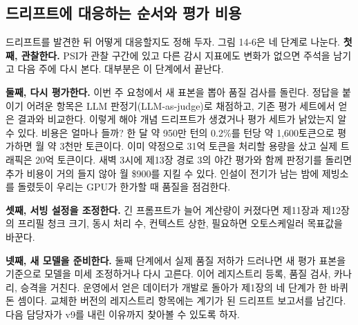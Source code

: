 \subsection*{드리프트에 대응하는 순서와 평가 비용}

드리프트를 발견한 뒤 어떻게 대응할지도 정해 두자. 그림 14-6은 네 단계로 나눈다. \textbf{첫째, 관찰한다.} PSI가 관찰 구간에 있고 다른 감시 지표에도 변화가 없으면 주석을 남기고 다음 주에 다시 본다. 대부분은 이 단계에서 끝난다.

\textbf{둘째, 다시 평가한다.} 이번 주 요청에서 새 표본을 뽑아 품질 검사를 돌린다. 정답을 붙이기 어려운 항목은 LLM 판정기(LLM-as-judge)로 채점하고, 기존 평가 세트에서 얻은 결과와 비교한다. 이렇게 해야 개념 드리프트가 생겼거나 평가 세트가 낡았는지 알 수 있다. 비용은 얼마나 들까? 한 달 약 950만 턴의 0.2\%를 턴당 약 1,600토큰으로 평가하면 월 약 3천만 토큰이다. 이미 약정으로 31억 토큰을 처리할 용량을 샀고 실제 트래픽은 20억 토큰이다. 새벽 3시에 제13장 경로 3의 야간 평가와 함께 판정기를 돌리면 추가 비용이 거의 들지 않아 월 \$900를 지킬 수 있다. 인설이 전기가 남는 밤에 제빙소를 돌렸듯이 우리는 GPU가 한가할 때 품질을 점검한다.

\textbf{셋째, 서빙 설정을 조정한다.} 긴 프롬프트가 늘어 계산량이 커졌다면 제11장과 제12장의 프리필 청크 크기, 동시 처리 수, 컨텍스트 상한, 필요하면 오토스케일러 목표값을 바꾼다.

\textbf{넷째, 새 모델을 준비한다.} 둘째 단계에서 실제 품질 저하가 드러나면 새 평가 표본을 기준으로 모델을 미세 조정하거나 다시 고른다. 이어 레지스트리 등록, 품질 검사, 카나리, 승격을 거친다. 운영에서 얻은 데이터가 개발로 돌아가 제1장의 네 단계가 한 바퀴 돈 셈이다. 교체한 버전의 레지스트리 항목에는 계기가 된 드리프트 보고서를 남긴다. 다음 담당자가 v9를 내린 이유까지 찾아볼 수 있도록 하자.


